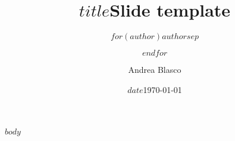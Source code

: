 \documentclass[
mathserif, 
ignorenonframetext,
$if(fontsize)$
	$fontsize$,
$else$
	10pt, 
$endif$
$if(aspectratio)$
	aspectratio=$aspectratio$,
$endif$
$if(handout)$
	handout,
$endif$
]{beamer}
\title{\large \bfseries $title$}
\title{\large \bfseries Slide template}
\author{$for(author)$$author$$sep$\and $endfor$}
\author{Andrea Blasco}
\date{$date$}
\date{\today}
\institute{$for(institute)$$institute$$sep$ \and $endfor$}
\begin{document}
\frame{
\thispagestyle{empty}
\titlepage
}

$body$
\end{document}
